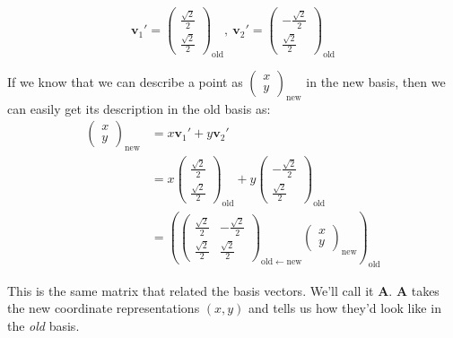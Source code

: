 	\begin{equation*}
		\mathbf v_1' = \begin{pmatrix}
			\frac{\sqrt 2}{2} \\ \frac{\sqrt 2}{2}
		\end{pmatrix}_{\mathrm{old}}, ~
		\mathbf v_2' = \begin{pmatrix}
			-\frac{\sqrt 2}{2} \\ \frac{\sqrt 2}{2}
		\end{pmatrix}_{\mathrm{old}}
	\end{equation*}
		
	If we know that we can describe a point as $\begin{pmatrix}
					x \\ y
		\end{pmatrix}_{\text{new}}$
	in the new basis, then we can easily get its description in the old basis as:
	\begin{equation}\label{eq:ContravariantTransform}
		\begin{aligned}
			\begin{pmatrix}
						x \\ y
			\end{pmatrix}_{\mathrm{new}} 
			&= x \mathbf v_1' + y \mathbf v_2' \\
			&= x \begin{pmatrix}
				\frac{\sqrt 2}{2} \\ \frac{\sqrt 2}{2}
			\end{pmatrix}_{\mathrm{old}} 
			+ y \begin{pmatrix}
				-\frac{\sqrt 2}{2} \\ \frac{\sqrt 2}{2}
			\end{pmatrix}_{\mathrm{old}}
			\\ &=\left( \begin{pmatrix}
				 \frac{\sqrt 2}{2} &  -\frac{\sqrt 2}{2} \\
				 \frac{\sqrt 2}{2} &  \frac{\sqrt 2}{2}
			\end{pmatrix}_{\mathrm{old} \leftarrow \mathrm{new}}
			\begin{pmatrix}
						x \\ y
			\end{pmatrix}_{\mathrm{new}} \right)_{\mathrm{old}} 
		\end{aligned}
	\end{equation}
	
	This is the same matrix that related the basis vectors. We'll call it $\mathbf A$. $\mathbf A$ takes the new coordinate representations $(x,y)$ and tells us how they'd look like in the \emph{old} basis. 

